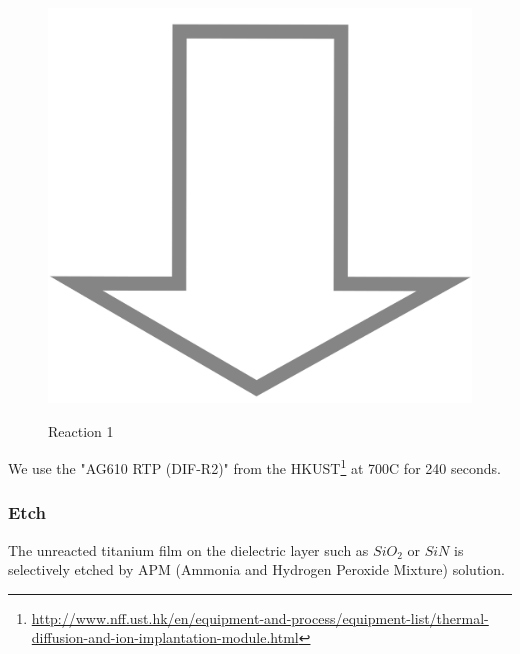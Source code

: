 \begin{figure}[H]
	\centering
	\begin{tikzpicture}[node distance = 3cm, auto, thick,scale=\CrossSectionOnly, every node/.style={transform shape}]
		
	\end{tikzpicture}\\
	\includegraphics[scale=0.01]{down_arrow.png}\\
	\begin{tikzpicture}[node distance = 3cm, auto, thick,scale=\CrossSectionOnly, every node/.style={transform shape}]
		
	\end{tikzpicture}
	\caption{Reaction 1}
\end{figure}

We use the "AG610 RTP (DIF-R2)" from the HKUST\footnote{\url{http://www.nff.ust.hk/en/equipment-and-process/equipment-list/thermal-diffusion-and-ion-implantation-module.html}} at 700\degree C for 240 seconds.

\subsubsection{Etch}

The unreacted titanium film on the dielectric layer such as $SiO_2$ or $SiN$ is selectively etched by APM (Ammonia and Hydrogen Peroxide Mixture) solution.

